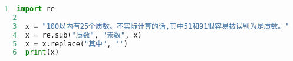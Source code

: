 \begin{spacing}{0.8}
\begin{lstlisting}[language=Python]
  1  import re
  2  
  3  x = "100以内有25个质数。不实际计算的话,其中51和91很容易被误判为是质数。"
  4  x = re.sub("质数", "素数", x)
  5  x = x.replace("其中", '')
  6  print(x)
\end{lstlisting}
\end{spacing}
